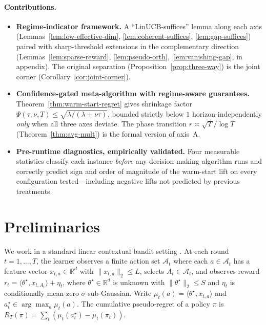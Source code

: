 \documentclass{article}
\theoremstyle{definition}
\theoremstyle{remark}
\theoremstyle{remark}
\begin{document}
\paragraph{Contributions.}
\begin{itemize}[itemsep=1pt, topsep=1pt, leftmargin=*]
\item \textbf{Regime-indicator framework.} A ``LinUCB-suffices'' lemma along
each axis (Lemmas~\ref{lem:low-effective-dim}, \ref{lem:coherent-suffices},
\ref{lem:gap-suffices}) paired with sharp-threshold extensions in the
complementary direction (Lemmas~\ref{lem:sparse-reward}, \ref{lem:pseudo-orth},
\ref{lem:vanishing-gap}, in appendix). The original separation
\cite{chen2024llmdecision} (Proposition~\ref{prop:three-way}) is the joint
corner (Corollary~\ref{cor:joint-corner}).
\item \textbf{Confidence-gated meta-algorithm with regime-aware guarantees.}
Theorem~\ref{thm:warm-start-regret} gives shrinkage factor
$\Psi(\tau,\nu,T)\!\le\!\sqrt{\lambda/(\lambda+\nu\tau)}$, bounded strictly
below $1$ horizon-independently \emph{only} when all three axes deviate. The
phase transition $r\!\asymp\!\sqrt T/\log T$ (Theorem~\ref{thm:avg-mult})
is the formal version of axis~A.
\item \textbf{Pre-runtime diagnostics, empirically validated.} Four measurable
statistics classify each instance \emph{before} any decision-making algorithm
runs and correctly predict sign and order of magnitude of the warm-start lift
on every configuration tested---including negative lifts not predicted by
previous treatments.
\end{itemize}


\section{Preliminaries}
\label{sec:preliminaries}

We work in a standard linear contextual bandit setting
\cite{zhu2022largeaction,zhu2022contextual}. At each round $t=1,\dots,T$, the
learner observes a finite action set $\mathcal A_t$ where each
$a\!\in\!\mathcal A_t$ has a feature vector $x_{t,a}\!\in\!\mathbb R^d$ with
$\|x_{t,a}\|_2\le L$, selects $A_t\!\in\!\mathcal A_t$, and observes reward
$r_t = \langle\theta^\star,x_{t,A_t}\rangle + \eta_t$, where
$\theta^\star\!\in\!\mathbb R^d$ is unknown with $\|\theta^\star\|_2\le S$ and
$\eta_t$ is conditionally mean-zero $\sigma$-sub-Gaussian. Write
$\mu_t(a)=\langle\theta^\star,x_{t,a}\rangle$ and
$a_t^\star\!\in\!\arg\max_a\mu_t(a)$. The cumulative pseudo-regret of a policy
$\pi$ is $R_T(\pi)=\sum_t(\mu_t(a_t^\star)-\mu_t(\pi_t))$.
\end{document}
